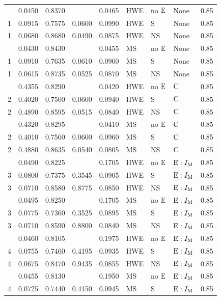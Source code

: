 \begin{longtable}[t]{lllllllll}
\endfoot
\bottomrule
\endlastfoot
1 & 0.0450 & 0.8370 &  & 0.0465 & HWE & no ${\rm E}$ & None & 0.85\\
1 & 0.0915 & 0.7575 & 0.0600 & 0.0990 & HWE & S & None & 0.85\\
1 & 0.0680 & 0.8680 & 0.0490 & 0.0875 & HWE & NS & None & 0.85\\
\addlinespace
1 & 0.0430 & 0.8430 &  & 0.0455 & MS & no ${\rm E}$ & None & 0.85\\
1 & 0.0910 & 0.7635 & 0.0610 & 0.0960 & MS & S & None & 0.85\\
1 & 0.0615 & 0.8735 & 0.0525 & 0.0870 & MS & NS & None & 0.85\\
\addlinespace
2 & 0.4355 & 0.8290 &  & 0.0420 & HWE & no ${\rm E}$ & ${\rm C}$ & 0.85\\
2 & 0.4020 & 0.7500 & 0.0600 & 0.0940 & HWE & S & ${\rm C}$ & 0.85\\
2 & 0.4890 & 0.8595 & 0.0515 & 0.0840 & HWE & NS & ${\rm C}$ & 0.85\\
\addlinespace
2 & 0.4320 & 0.8295 &  & 0.0410 & MS & no ${\rm E}$ & ${\rm C}$ & 0.85\\
2 & 0.4010 & 0.7560 & 0.0600 & 0.0960 & MS & S & ${\rm C}$ & 0.85\\
2 & 0.4880 & 0.8635 & 0.0540 & 0.0805 & MS & NS & ${\rm C}$ & 0.85\\
\addlinespace
3 & 0.0490 & 0.8225 &  & 0.1705 & HWE & no ${\rm E}$ & ${\rm E}:I_{{\rm M}}$ & 0.85\\
3 & 0.0800 & 0.7375 & 0.3545 & 0.0905 & HWE & S & ${\rm E}:I_{{\rm M}}$ & 0.85\\
3 & 0.0710 & 0.8580 & 0.8775 & 0.0850 & HWE & NS & ${\rm E}:I_{{\rm M}}$ & 0.85\\
\addlinespace
3 & 0.0495 & 0.8250 &  & 0.1705 & MS & no ${\rm E}$ & ${\rm E}:I_{{\rm M}}$ & 0.85\\
3 & 0.0775 & 0.7360 & 0.3525 & 0.0895 & MS & S & ${\rm E}:I_{{\rm M}}$ & 0.85\\
3 & 0.0710 & 0.8590 & 0.8800 & 0.0840 & MS & NS & ${\rm E}:I_{{\rm M}}$ & 0.85\\
\addlinespace
4 & 0.0460 & 0.8105 &  & 0.1975 & HWE & no ${\rm E}$ & ${\rm E}:I_{{\rm M}}$ & 0.85\\
4 & 0.0755 & 0.7460 & 0.4195 & 0.0935 & HWE & S & ${\rm E}:I_{{\rm M}}$ & 0.85\\
4 & 0.0675 & 0.8470 & 0.9435 & 0.0855 & HWE & NS & ${\rm E}:I_{{\rm M}}$ & 0.85\\
\addlinespace
4 & 0.0455 & 0.8130 &  & 0.1950 & MS & no ${\rm E}$ & ${\rm E}:I_{{\rm M}}$ & 0.85\\
4 & 0.0725 & 0.7440 & 0.4150 & 0.0945 & MS & S & ${\rm E}:I_{{\rm M}}$ & 0.85\\

\end{longtable}
